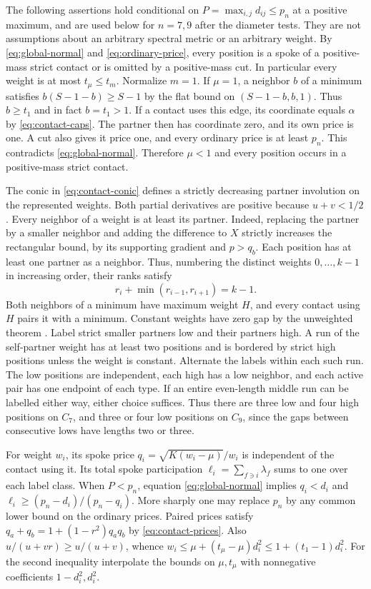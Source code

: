 \documentclass[11pt,a4paper]{article}
\theoremstyle{definition}
\begin{document}
The following assertions hold conditional on $P=\max_{i,j}d_{ij}\le p_n$
at a positive maximum, and are used below for $n=7,9$ after the diameter
tests. They are not assumptions about an arbitrary spectral metric or
an arbitrary weight. By \eqref{eq:global-normal} and
\eqref{eq:ordinary-price}, every position is a spoke of a positive-mass
strict contact or is omitted by a positive-mass cut. In particular every
weight is at most $t_\mu\le t_m$. Normalize $m=1$.
If $\mu=1$, a neighbor $b$ of a minimum satisfies
$b(S-1-b)\ge S-1$ by the flat bound on $(S-1-b,b,1)$. Thus
$b\ge t_1$ and in fact $b=t_1>1$. If a contact uses this edge, its
coordinate equals $\alpha$ by \eqref{eq:contact-caps}. The partner then
has coordinate zero, and its own price is one. A cut also gives it price
one, and every ordinary price is at least $p_n$. This contradicts
\eqref{eq:global-normal}. Therefore $\mu<1$ and every position occurs in
a positive-mass strict contact.

The conic in \eqref{eq:contact-conic} defines a strictly decreasing
partner involution on the represented weights. Both partial derivatives
are positive because $u+v<1/2$. Every neighbor of a weight is at least
its partner. Indeed, replacing the partner by a smaller neighbor and adding the
difference to $X$ strictly increases the rectangular bound, by its
supporting gradient and $p>q_b$. Each position has at least one partner
as a neighbor. Thus, numbering the distinct weights $0,\dots,k-1$ in
increasing order, their ranks satisfy
\begin{equation}\label{eq:marked-order}
 r_i+\min(r_{i-1},r_{i+1})=k-1.
\end{equation}
Both neighbors of a minimum have maximum weight $H$, and every contact
using $H$ pairs it with a minimum. Constant weights have zero gap by
the unweighted theorem \cite{Jiang}. Label strict smaller partners low and
their partners high. A run of the self-partner weight has at least two
positions and is bordered by strict high positions unless the weight is
constant. Alternate the labels within each such run. The low positions
are independent, each high has a low neighbor, and each active pair
has one endpoint of each type. If an entire even-length middle run can
be labelled either way, either choice suffices. Thus there are three low
and four high positions on $C_7$, and three or four low positions on
$C_9$, since the gaps between consecutive lows have lengths two or three.

For weight $w_i$, its spoke price $q_i=\sqrt{K(w_i-\mu)}/w_i$ is
independent of the contact using it. Its total spoke participation
$\ell_i=\sum_{f\ni i}\lambda_f$ sums to one over each label class.
When $P<p_n$, equation \eqref{eq:global-normal} implies $q_i<d_i$ and
$\ell_i\ge(p_n-d_i)/(p_n-q_i)$. More sharply one may replace $p_n$ by
any common lower bound on the ordinary prices. Paired prices satisfy
$q_a+q_b=1+(1-r^2)q_aq_b$ by \eqref{eq:contact-prices}.
Also $u/(u+vr)\ge u/(u+v)$, whence
$w_i\le\mu+(t_\mu-\mu)d_i^2\le1+(t_1-1)d_i^2$.
For the second inequality interpolate the bounds on $\mu,t_\mu$ with
nonnegative coefficients $1-d_i^2,d_i^2$.
\end{document}
